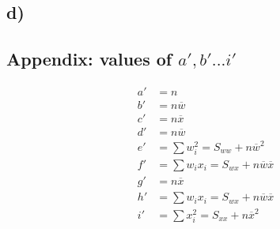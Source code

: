 \documentclass[a4paper]{article}
\begin{document}
\subsection*{d)}
\newpage
\begin{appendix}
\section*{Appendix: values of $a', b' ... i'$} 

\begin{equation*}
\begin{split}
	a' & = n \\
	b' & = n\overline{w} \\
	c' & = n\overline{x} \\
	d' & = n\overline{w} \\
	e' & = \sum{w_{i}^2} = S_{ww}+n\overline{w}^2 \\
	f' & = \sum{w_{i}x_{i}} = S_{wx} + n\overline{w}\overline{x} \\
	g' & = n\overline{x} \\
	h' & = \sum{w_{i}x_{i}} = S_{wx} + n\overline{w}\overline{x} \\
	i' & = \sum{x_{i}^2} = S_{xx}+n\overline{x}^2 
\end{split}
\end{equation*}

\end{appendix}
\end{document}
